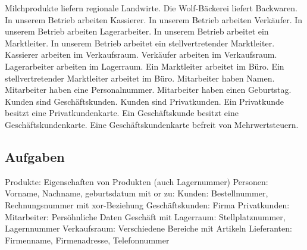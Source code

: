 \documentclass[a4paper,10pt]{scrartcl}
\begin{document}
Milchprodukte liefern regionale Landwirte.\newline
\newline
Die Wolf-Bäckerei liefert Backwaren.\newline
\newline
In unserem Betrieb arbeiten Kassierer.\newline
In unserem Betrieb arbeiten Verkäufer.\newline
In unserem Betrieb arbeiten Lagerarbeiter.\newline
In unserem Betrieb arbeitet ein Marktleiter.\newline
In unserem Betrieb arbeitet ein stellvertretender Marktleiter.\newline
\newline
Kassierer arbeiten im Verkaufsraum.\newline
Verkäufer arbeiten im Verkaufsraum.\newline
Lagerarbeiter arbeiten im Lagerraum.\newline
Ein Marktleiter arbeitet im Büro.\newline
Ein stellvertretender Marktleiter arbeitet im Büro.\newline
\newline
Mitarbeiter haben Namen.\newline
Mitarbeiter haben eine Personalnummer.\newline
Mitarbeiter haben einen Geburtstag.\newline
\newline
Kunden sind Geschäftskunden.\newline
Kunden sind Privatkunden.\newline
\newline
Ein Privatkunde besitzt eine Privatkundenkarte.\newline
Ein Geschäftskunde besitzt eine Geschäftskundenkarte.\newline
Eine Geschäftskundenkarte befreit von Mehrwertsteuern.\newline

\subsection{Aufgaben}
Produkte: Eigenschaften von Produkten (auch Lagernummer)
Personen: Vorname, Nachname, geburtsdatum mit or zu:
Kunden: Bestellnummer, Rechnungsnummer mit xor-Beziehung
Geschäftskunden: Firma
Privatkunden: 
Mitarbeiter: Persöhnliche Daten
Geschäft mit 
Lagerraum: Stellplatznummer, Lagernnummer
Verkaufsraum: Verschiedene Bereiche mit Artikeln
Lieferanten: Firmenname, Firmenadresse, Telefonnummer   
\end{document}
